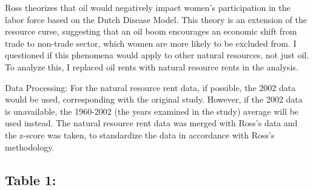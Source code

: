 \documentclass[12pt,letterpaper]{article}
\begin{document}
\vspace{.5cm}

\noindent Ross theorizes that oil would negatively impact women's participation in the labor force based on the Dutch Disease Model. This theory is an extension of the resource curse, suggesting that an oil boom encourages an economic shift from trade to non-trade sector, which women are more likely to be excluded from. I questioned if this phenomena would apply to other natural resources, not just oil. To analyze this, I replaced oil rents with natural resource rents in the analysis. 

\vspace{.5cm}

\noindent Data Processing: For the natural resource rent data, if possible, the 2002 data would be used, corresponding with the original study. However, if the 2002 data is unavailable, the 1960-2002 (the years examined in the study) average will be used instead. The natural resource rent data was merged with Ross's data and the z-score was taken, to standardize the data in accordance with Ross's methodology.

\vspace{.5cm}



\subsection*{Table 1:}


\end{document}
